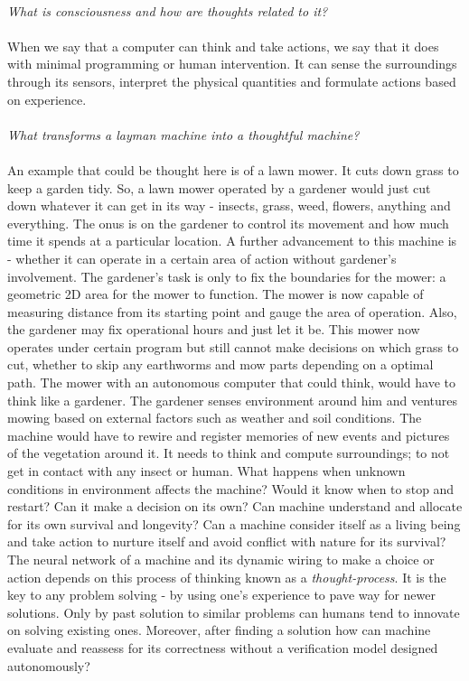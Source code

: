 \documentclass[a4paper]{article}
\begin{document}
	\paragraph{}
	\textit{What is consciousness and how are thoughts related to it?}
	\paragraph{}
	When we say that a computer can think and take actions, we say that it does with minimal programming or human
	intervention. It can sense the surroundings through its sensors, interpret the physical quantities and formulate
	actions based on experience.
	\paragraph{}
	\textit{What transforms a layman machine into a thoughtful machine?}
	\paragraph{}
	An example that could be thought here is of a lawn mower. It cuts down grass to keep a garden tidy. So, a 
	lawn mower operated by a gardener would just cut down whatever it can get in its way - insects, grass, weed, flowers,
	anything and everything. The onus is on the gardener to control its movement and how much time it spends at a particular
	location. A further advancement to this machine is - whether it can operate in a certain area of action without gardener's
	involvement. The gardener's task is only to fix the boundaries for the mower: a geometric 2D area for the mower to function.
	The mower is now capable of measuring distance from its starting point and gauge the area of operation. Also, the gardener may
	fix operational hours and just let it be. This mower now operates under certain program but still cannot make decisions on which
	grass to cut, whether to skip any earthworms and mow parts depending on a optimal path. The mower with an autonomous computer
	that could think, would have to think like a gardener. The gardener senses environment around him and ventures mowing based on external
	factors such as weather and soil conditions. The machine would have to rewire and register memories of new events and pictures of the
	vegetation around it. It needs to think and compute surroundings; to not get in contact with any insect or human. What happens when unknown
	conditions in environment affects the machine? Would it know when to stop and restart? Can it make a decision on its own? Can machine
	understand and allocate for its own survival and longevity? Can a machine consider itself as a living being and take action to 
	nurture itself and avoid conflict with nature for its survival? The neural network of a machine and its dynamic wiring to make a choice
	or action depends on this process of thinking known as a \textit{thought-process}. It is the key to any problem solving - by using one's
	experience to pave way for newer solutions. Only by past solution to similar problems can humans tend to innovate on solving existing ones.
	Moreover, after finding a solution how can machine evaluate and reassess for its correctness without a verification model designed autonomously?
\end{document}
